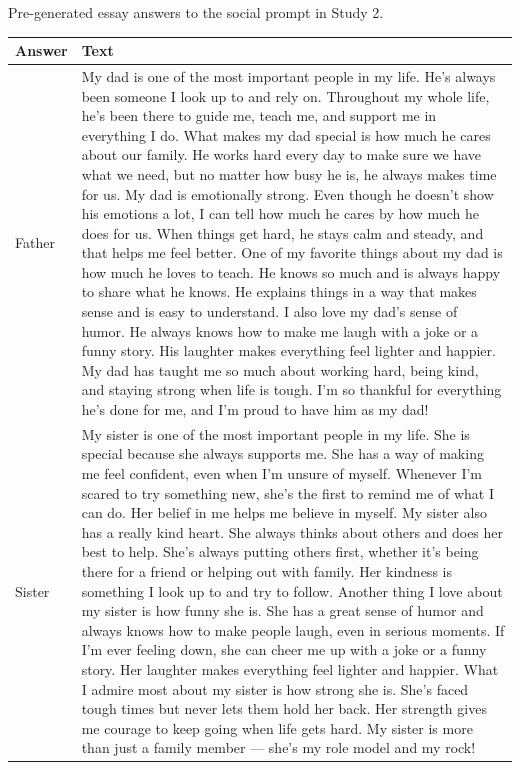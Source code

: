 \documentclass[
  man,
  floatsintext,
  longtable,
  nolmodern,
  notxfonts,
  notimes,
  colorlinks=true,linkcolor=blue,citecolor=blue,urlcolor=blue]{apa7}
\begin{document}
\begin{supptbl}[H]

\caption{\label{supptbl-essay-answers-social-study2}Pre-generated essay
answers to the social prompt in Study 2.}

\begin{minipage}{\linewidth}

\begingroup
\linespread{1}\selectfont
\centering\begingroup\fontsize{10}{12}\selectfont

\begin{tabular}{>{\raggedright\arraybackslash}p{2cm}>{\raggedright\arraybackslash}p{14cm}}
\toprule
Answer & Text\\
\midrule
Father & My dad is one of the most important people in my life. He's always been someone I look up to and rely on. Throughout my whole life, he's been there to guide me, teach me, and support me in everything I do. What makes my dad special is how much he cares about our family. He works hard every day to make sure we have what we need, but no matter how busy he is, he always makes time for us. My dad is emotionally strong. Even though he doesn't show his emotions a lot, I can tell how much he cares by how much he does for us. When things get hard, he stays calm and steady, and that helps me feel better. One of my favorite things about my dad is how much he loves to teach. He knows so much and is always happy to share what he knows. He explains things in a way that makes sense and is easy to understand. I also love my dad's sense of humor. He always knows how to make me laugh with a joke or a funny story. His laughter makes everything feel lighter and happier. My dad has taught me so much about working hard, being kind, and staying strong when life is tough. I'm so thankful for everything he's done for me, and I'm proud to have him as my dad!\\
Sister & My sister is one of the most important people in my life. She is special because she always supports me. She has a way of making me feel confident, even when I'm unsure of myself. Whenever I'm scared to try something new, she's the first to remind me of what I can do. Her belief in me helps me believe in myself. My sister also has a really kind heart. She always thinks about others and does her best to help. She's always putting others first, whether it's being there for a friend or helping out with family. Her kindness is something I look up to and try to follow. Another thing I love about my sister is how funny she is. She has a great sense of humor and always knows how to make people laugh, even in serious moments. If I'm ever feeling down, she can cheer me up with a joke or a funny story. Her laughter makes everything feel lighter and happier. What I admire most about my sister is how strong she is. She's faced tough times but never lets them hold her back. Her strength gives me courage to keep going when life gets hard. My sister is more than just a family member — she's my role model and my rock!\\

\end{tabular}
\end{minipage}
\end{supptbl}
\end{document}
